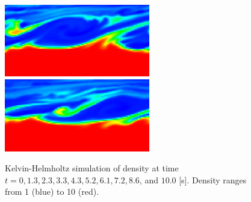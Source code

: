 \documentclass[final]{siamltex}
\begin{document}
\begin{figure}
\begin{center}
\includegraphics[width=2.5in]{KHLM8}
\includegraphics[width=2.5in]{KHLM9}
\caption{Kelvin-Helmholtz simulation of density at time
         $t=0, 1.3, 2.3, 3.3, 4.3, 5.2, 6.1, 7.2, 8.6$, and $10.0$ [s].
         Density ranges from 1 (blue) to 10 (red).}\label{fig:KHLM}
\end{center}
\end{figure}
\end{document}
